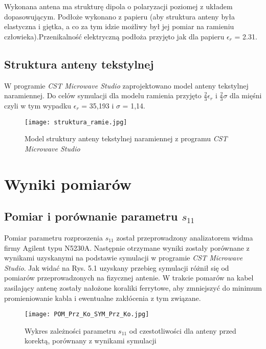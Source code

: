 Wykonana antena ma strukturę dipola o polaryzacji poziomej z układem dopasowującym. 
Podłoże wykonano z papieru (aby struktura anteny była elastyczna i giętka, a co za tym idzie możliwy był jej pomiar na ramieniu człowieka).Przenikalność elektryczną podłoża przyjęto jak dla papieru $\epsilon_{r}$ = 2.31.

\noindent
\newline

 
\newpage
\section{Struktura anteny tekstylnej}

W programie \emph{CST Microwave Studio} zaprojektowano  model anteny tekstylnej naramiennej. Do celów symulacji dla modelu ramienia przyjęto $\frac{2}{3}\epsilon_{r}$ i $\frac{2}{3}\sigma$ dla mięśni czyli w tym wypadku $\epsilon_{r}$ = 35,193 i $\sigma$ = 1,14.

\begin{figure}[h!]
	\centering
	    \texttt{[image: struktura\_ramie.jpg]}
	    \caption{Model struktury anteny tekstylnej naramiennej z programu \emph{CST Microwave Studio}}
\end{figure}


\chapter{Wyniki pomiarów}

\section{Pomiar i porównanie parametru $s_{11}$}

Pomiar parametru rozproszenia $s_{11}$ został przeprowadzony analizatorem widma firmy Agilent typu N5230A. Następnie otrzymane wyniki zostały porównane z wynikami uzyskanymi na podstawie symulacji w programie \emph{CST Microwave Studio}. Jak widać na Rys. 5.1 uzyskany przebieg symulacji różnił się od pomiarów przeprowadzonych na fizycznej antenie. W trakcie pomarów na kabel zasilający antenę zostały nałożone koraliki ferrytowe, aby zmniejszyć do minimum promieniowanie kabla i ewentualne zakłócenia z tym związane. 


\begin{figure}[h!]
\centering
	\texttt{[image: POM\_Prz\_Ko\_SYM\_Prz\_Ko.jpg]}
	\caption{Wykres zależności parametru $s_{11}$ od czestotliwości dla anteny przed korektą, porównany z wynikami symulacji}
\end{figure}


